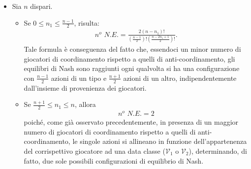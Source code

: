 \documentclass[11pt,largemargins]{homework}
\begin{document}
\begin{alphaparts}
\begin{itemize}
\begin{itemize}
      \end{itemize}
      \item Sia $n$ dispari.
      \begin{itemize}\item Se $0\leq n_{1}\leq \frac{n-1}{2}$, risulta:
      \begin{align*}
      n^{o} \, \,  N.E.=\frac{2\left(n-n_1\right)!}{\left(\frac{n-1}{2}\right)!\left(\frac{n-2n_1+1}{2}\right)!}.
      \end{align*}
      Tale formula è conseguenza del fatto che, essendoci un minor numero di giocatori di coordinamento rispetto a quelli di anti-coordinamento, gli equilibri di Nash sono raggiunti ogni qualvolta si ha una configurazione con $\frac{n-1}{2}$ azioni di un tipo e $\frac{n+1}{2}$ azioni di un altro, indipendentemente dall'insieme di provenienza dei giocatori.
      \item Se $\frac{n+1}{2}\leq n_1 \leq n$, allora
      \begin{align*}
       n^{o} \, \,  N.E.=2
       \end{align*}
       poiché, come già osservato precedentemente, in presenza di un maggior numero di giocatori di coordinamento rispetto a quelli di anti-coordinamento, le singole azioni si allineano in funzione dell'appartenenza del corrispettivo giocatore ad una data classe ($\mathcal{V}_1$ o  $\mathcal{V}_2$), determinando, di fatto, due sole possibili configurazioni di equilibrio di Nash. 
    \end{itemize}  
    \end{itemize} 
  \end{alphaparts}
\end{document}
